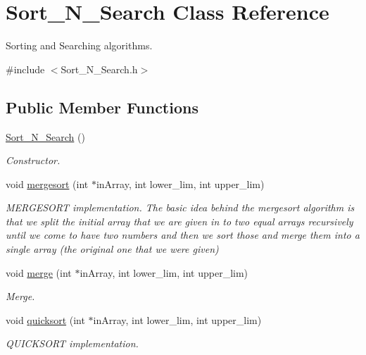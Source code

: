 \hypertarget{class_sort___n___search}{\section{Sort\-\_\-\-N\-\_\-\-Search Class Reference}
\label{class_sort___n___search}
}


Sorting and Searching algorithms.  




{\ttfamily \#include $<$Sort\-\_\-\-N\-\_\-\-Search.\-h$>$}

\subsection*{Public Member Functions}
\begin{DoxyCompactItemize}
\item 
\hyperlink{class_sort___n___search_acf81cd769d970ce94376d7303bc5b7c9}{Sort\-\_\-\-N\-\_\-\-Search} ()
\begin{DoxyCompactList}\small\item\em Constructor. \end{DoxyCompactList}\item 
void \hyperlink{class_sort___n___search_ad34f3e05b8ed39ea004e7253b7d7c068}{mergesort} (int $\ast$in\-Array, int lower\-\_\-lim, int upper\-\_\-lim)
\begin{DoxyCompactList}\small\item\em M\-E\-R\-G\-E\-S\-O\-R\-T implementation. The basic idea behind the mergesort algorithm is that we split the initial array that we are given in to two equal arrays recursively until we come to have two numbers and then we sort those and merge them into a single array (the original one that we were given) \end{DoxyCompactList}\item 
void \hyperlink{class_sort___n___search_a92480efea81ee755f6353d9a2e96ee03}{merge} (int $\ast$in\-Array, int lower\-\_\-lim, int upper\-\_\-lim)
\begin{DoxyCompactList}\small\item\em Merge. \end{DoxyCompactList}\item 
void \hyperlink{class_sort___n___search_a6bfaafde8113af23379d2e2091531c5a}{quicksort} (int $\ast$in\-Array, int lower\-\_\-lim, int upper\-\_\-lim)
\begin{DoxyCompactList}\small\item\em Q\-U\-I\-C\-K\-S\-O\-R\-T implementation. \end{DoxyCompactList}\item 

\end{DoxyCompactItemize}
